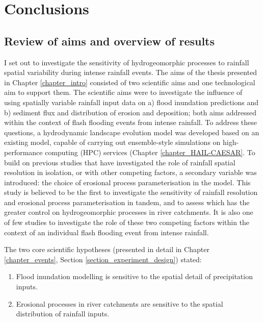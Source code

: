 \chapter{Conclusions}
\label{chapter_conclusion}

\section{Review of aims and overview of results}

I set out to investigate the sensitivity of hydrogeomorphic processes to rainfall spatial variability during intense rainfall events. The aims of the thesis presented in Chapter \ref{chapter_intro} consisted of two scientific aims and one technological aim to support them. The scientific aims were to investigate the influence of using spatially variable rainfall input data on a) flood inundation predictions and b) sediment flux and distribution of erosion and deposition; both aims addressed within the context of flash flooding events from intense rainfall. To address these questions, a hydrodynamic landscape evolution model was developed based on an existing model, capable of carrying out ensemble-style simulations on high-performance computing (HPC) services (Chapter \ref{chapter_HAIL-CAESAR}. To build on previous studies that have investigated the role of rainfall spatial resolution in isolation, or with other competing factors, a secondary variable was introduced: the choice of erosional process parameterisation in the model. This study is believed to be the first to investigate the sensitivity of rainfall resolution and erosional process parameterisation in tandem, and to assess which has the greater control on hydrogeomorphic processes in river catchments. It is also one of few studies to investigate the role of these two competing factors within the context of an individual flash flooding event from intense rainfall. 

The two core scientific hypotheses (presented in detail in Chapter \ref{chapter_events}, Section \ref{section_experiment_design}) stated:

\begin{enumerate}
\item Flood inundation modelling is sensitive to the spatial detail of precipitation inputs.
\item Erosional processes in river catchments are sensitive to the spatial distribution of rainfall inputs.
\end{enumerate}

